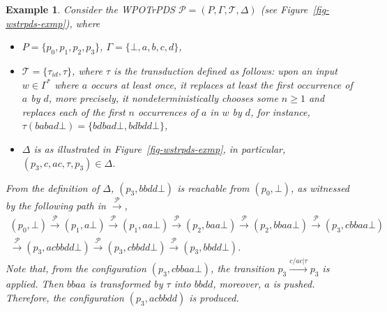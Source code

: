 \documentclass[preprint,12pt]{elsarticle}
\newtheorem{example}{Example}
\newcommand\Pp{{\mathcal{P} }}
\newcommand\TranSet{{\mathscr{T} }}
\newcommand{\WOTrPDS}{\textsf{WPOTrPDS}}
\begin{document}
\begin{example}\label{exmp-wpotrpds}
Consider the {\WOTrPDS} $\Pp=(P, \Gamma, \TranSet, \Delta)$ (see Figure~\ref{fig-wstrpds-exmp}), where 
\begin{itemize}
\item $P = \{p_0, p_1, p_2, p_3\}$,  $\Gamma = \{\bot, a, b, c, d\}$,
% 
\item $\TranSet = \{\tau_{id}, \tau\}$, where $\tau$ is the transduction defined as follows: upon an input $w \in \Gamma^*$ where $a$ occurs at least once, it replaces at least the first occurrence of $a$ by $d$, more precisely, it nondeterministically chooses some $n \ge 1$ and replaces each of the first $n$ occurrences of $a$ in $w$ by $d$, for instance, $\tau(babad\bot) = \{bdbad\bot, bdbdd\bot\}$,
%
\item $\Delta$ is as illustrated in Figure~\ref{fig-wstrpds-exmp}, in particular, $(p_3, c, ac, \tau, p_3) \in \Delta$. 
\end{itemize}

From the definition of $\Delta$, $(p_3, bbdd\bot)$ is reachable from $(p_0, \bot)$, as witnessed by the following path in $\xrightarrow{\Pp}$, 
\[
\begin{array}{l}
(p_0, \bot) \xrightarrow{\Pp} (p_1, a \bot) \xrightarrow{\Pp} (p_1, aa \bot) \xrightarrow{\Pp} (p_2, baa \bot)  \xrightarrow{\Pp} (p_2, bbaa \bot)  \xrightarrow{\Pp} (p_3, cbbaa \bot)  \\
\xrightarrow{\Pp} (p_3, acbbdd \bot) \xrightarrow{\Pp} (p_3, cbbdd \bot)  \xrightarrow{\Pp} (p_3, bbdd \bot). 
\end{array}
\]
Note that, from the configuration $(p_3, cbbaa \bot)$, the transition $p_3 \xrightarrow{c/ac|\tau } p_3$ is applied. Then  $bbaa$ is transformed by $\tau$ into $bbdd$, moreover, $a$ is pushed. Therefore, the configuration $(p_3, acbbdd)$ is produced.


\end{example}
\end{document}
